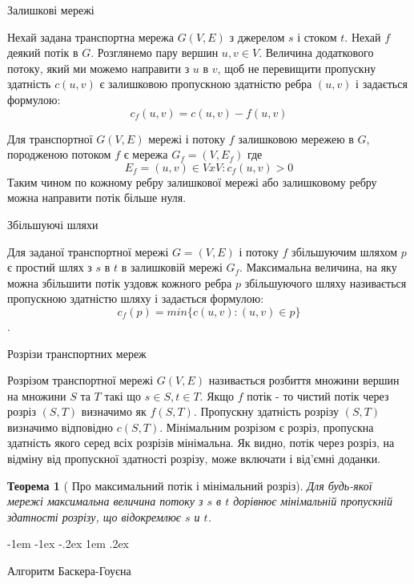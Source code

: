\documentclass[a4paper,14pt,russian,ukrainian,oneside,final]{extreport}
\makeatletter
\newlength{\fivecharsapprox}
\renewcommand\subsection{%
  \@startsection{subsection}{2}%
    {\fivecharsapprox}%
    {-1em \@plus -1ex \@minus -.2ex}%
    {1em \@plus .2ex}%
    {\raggedright\hyphenpenalty=10000\normalfont\normalsize\bfseries}}
\makeatother
\begin{document}
\indent Залишкові мережі

\indent Нехай задана транспортна мережа $G(V,E)$ з джерелом $s$ і стоком $t$. Нехай $f$ деякий потік в $G$.
Розглянемо пару вершин $u,v \in V$. Величина додаткового потоку, який ми можемо 
направити з $u$ в $v$, щоб не перевищити пропускну здатність $c(u,v)$ є залишковою 
пропускною здатністю ребра $(u,v)$ і задається формулою:
$$c_{f}(u,v)=c(u,v)-f(u,v)$$

Для транспортної $G(V,E)$ мережі і потоку $f$ залишковою мережею в $G$, породженою потоком $f$ є мережа 
$G_{f}=(V,E_{f})$  где $$E_{f}=(u,v)\in VxV:c_{f}(u,v)>0$$
Таким чином по кожному ребру залишкової мережі або залишковому ребру можна направити потік більше нуля.

\indent Збільшуючі шляхи

\indent Для заданої транспортної мережі $G=(V,E)$ і потоку $f$ збільшуючим шляхом $p$ є простий шлях з $s$ в $t$ в залишковій мережі $G_{f}$.
Максимальна величина, на яку можна збільшити потік уздовж кожного ребра $p$ збільшуючого шляху називається пропускною здатністю шляху і задається формулою:
$$c_{f}(p)=min\{c(u,v):(u,v)\in p\}$$.

\indent Розрізи транспортних мереж

\indent Розрізом транспортної мережі $G(V,E)$ називається розбиття множини вершин на множини $S$ та $T$ такі що $s\in S, t\in T$.
Якщо $f$ потік - то чистий потік через розріз $(S,T)$ визначимо як $f(S,T)$.
Пропускну здатність розрізу $(S,T)$ визначимо відповідно $c(S,T)$.
Мінімальним розрізом є розріз, пропускна здатність якого серед всіх розрізів мінімальна. Як видно, 
потік через розріз, на відміну від пропускної здатності розрізу, може включати і від’ємні доданки.
\newtheorem{theorem}{Теорема}
\begin{theorem}[ Про максимальний потік і мінімальний розріз]
Для будь-якої мережі максимальна величина потоку з $s$ в $t$ 
дорівнює мінімальній пропускній здатності розрізу, що відокремлює $s$ и $t$.  \cite{ford}
\end{theorem}

\subsection{Алгоритм Баскера-Гоуєна}
\end{document}
